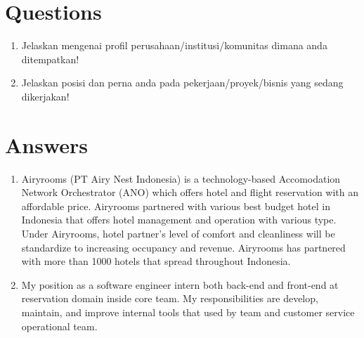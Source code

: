 \documentclass[12pt, letterpaper]{article}
\begin{document}
\section*{Questions}
\begin{enumerate}
    \item Jelaskan mengenai profil perusahaan/institusi/komunitas dimana anda ditempatkan!
    \item Jelaskan posisi dan perna anda pada pekerjaan/proyek/bisnis yang sedang dikerjakan!
\end{enumerate}

\section*{Answers}
\begin{enumerate}
    \item Airyrooms (PT Airy Nest Indonesia) is a technology-based Accomodation Network Orchestrator (ANO) which offers hotel and flight reservation with an affordable price. Airyrooms partnered with various best budget hotel in Indonesia that offers hotel management and operation with various type. Under Airyrooms, hotel partner's level of comfort and cleanliness will be standardize to increasing occupancy and revenue. Airyrooms has partnered with more than 1000 hotels that spread throughout Indonesia.
    \item My position as a software engineer intern both back-end and front-end at reservation domain inside core team. My responsibilities are develop, maintain, and improve internal tools that used by team and customer service operational team. 
\end{enumerate}
\end{document}
